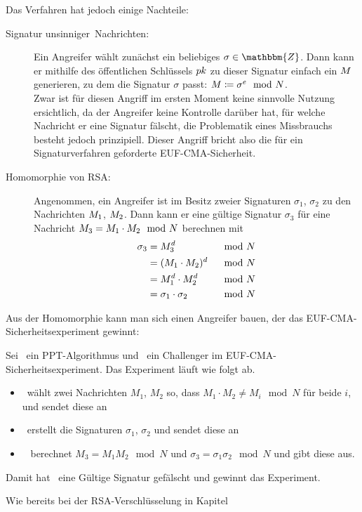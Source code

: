 Das Verfahren hat jedoch einige Nachteile:
\begin{description}
\item[Signatur \glqq unsinniger\grqq~Nachrichten:] Ein Angreifer
  wählt zunächst ein beliebiges $\sigma \in \mathbbm{Z}$. Dann kann er
  mithilfe des öffentlichen Schlüssels $pk$ zu dieser Signatur einfach
  ein $M$ generieren, zu dem die Signatur $\sigma$ passt: $M
  \coloneqq \sigma^e \mod N$.\\ Zwar ist für diesen Angriff im ersten Moment
  keine sinnvolle Nutzung ersichtlich, da der Angreifer keine Kontrolle
  darüber hat, für welche Nachricht er eine Signatur fälscht, die
  Problematik eines Missbrauchs besteht jedoch prinzipiell. Dieser Angriff
  bricht also die für ein Signaturverfahren geforderte EUF-CMA-Sicherheit.
\item[Homomorphie von RSA:]\indexRSAHomomorphie Angenommen, ein
  Angreifer ist im Besitz zweier Signaturen $\sigma_1$, $\sigma_2$ zu den
  Nachrichten $M_1$, $M_2$. Dann kann er eine gültige Signatur
  $\sigma_3$ für eine Nachricht $M_3 = M_1 \cdot M_2
  \mod N$ berechnen mit
  \begin{alignat*}{2} 
    \sigma_3 &= M_3^d & \mod N\\
    &= (M_1 \cdot M_2)^d & \mod N \\
    &= M_1^d \cdot M_2^d &\mod N\\
    &= \sigma_1 \cdot \sigma_2 &\mod N
  \end{alignat*}
\end{description}
Aus der Homomorphie kann man sich einen Angreifer
bauen, der das EUF-CMA-Sicherheits\-experiment gewinnt:
\begin{beispiel} Sei \A~ein PPT-Algorithmus und \C~ein Challenger im
  EUF-CMA-Sicherheits\-experiment. Das Experiment läuft wie folgt ab.
  \begin{itemize}
  \item \A~wählt zwei Nachrichten $M_1$, $M_2$ so, dass $ M_1\cdot M_2
    \neq M_i \mod N$ für beide $i$, und sendet diese an \C
  \item \C~erstellt die Signaturen $\sigma_1$, $\sigma_2$ und sendet
    diese an \A
  \item \A~ berechnet $M_3=M_1M_2 \mod N$ und
    $\sigma_3=\sigma_1\sigma_2 \mod N$ und gibt diese aus.
  \end{itemize} Damit hat \A~eine Gültige Signatur gefälscht und
  gewinnt das Experiment.
\end{beispiel} Wie bereits bei der RSA-Verschlüsselung in Kapitel
